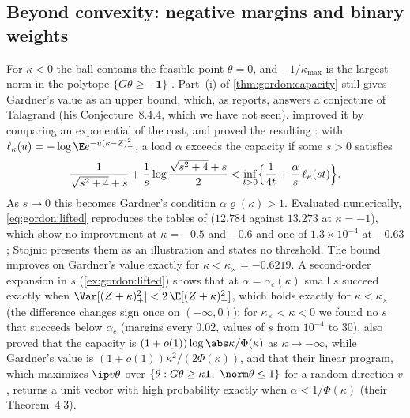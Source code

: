 \begin{refsection}
\subsection{Beyond convexity: negative margins and binary weights}\label{sec:gordon:beyond}

For $\kappa<0$ the ball contains the feasible point $\theta=0$, and $-1/\kappa_{\max}$ is the largest norm in the polytope $\{G\theta\ge-\mathbf 1\}$ \parencite{MontanariZhongZhou2024}. Part~(i) of \cref{thm:gordon:capacity} still gives Gardner's value as an upper bound, which, as \textcite[Section~2.3]{Stojnic2013a} reports, answers a conjecture of Talagrand (his Conjecture~8.4.4, which we have not seen). \Textcite{Stojnic2013b} improved it by comparing an exponential of the cost, and \textcite[Definition~2, Theorem~4.2]{MontanariZhongZhou2024} proved the resulting : with $\ell_\kappa(u)=-\log\E e^{-u(\kappa-Z)_+^2}$, a load $\alpha$ exceeds the capacity if some $s>0$ satisfies
\begin{equation}\label{eq:gordon:lifted}
\frac1{\sqrt{s^2+4}+s}+\frac1s\log\frac{\sqrt{s^2+4}+s}2<\inf_{t>0}\Bigl\{\frac1{4t}+\frac\alpha s\,\ell_\kappa(st)\Bigr\}.
\end{equation}
As $s\to0$ this becomes Gardner's condition $\alpha\varrho(\kappa)>1$. Evaluated numerically, \eqref{eq:gordon:lifted} reproduces the tables of \textcite{Stojnic2013b} ($12.784$ against $13.273$ at $\kappa=-1$), which show no improvement at $\kappa=-0.5$ and $-0.6$ and one of $1.3\times10^{-4}$ at $-0.63$; Stojnic presents them as an illustration and states no threshold. The bound improves on Gardner's value exactly for $\kappa<\kappa_\times=-0.6219$. A second-order expansion in $s$ (\cref{ex:gordon:lifted}) shows that at $\alpha=\alpha_c(\kappa)$ small $s$ succeed exactly when $\Var[(Z+\kappa)_+^2]<2\,\E[(Z+\kappa)_+^2]$, which holds exactly for $\kappa<\kappa_\times$ (the difference changes sign once on $(-\infty,0)$); for $\kappa_\times<\kappa<0$ we found no $s$ that succeeds below $\alpha_c$ (margins every $0.02$, values of $s$ from $10^{-4}$ to $30$). \Textcite{MontanariZhongZhou2024} also proved that the capacity is $(1+o(1))\log\abs\kappa/\Phi(\kappa)$ as $\kappa\to-\infty$, while Gardner's value is $(1+o(1))\kappa^2/(2\Phi(\kappa))$, and that their linear program, which maximizes $\ip v\theta$ over $\{\theta:G\theta\ge\kappa\mathbf 1,\ \norm\theta\le1\}$ for a random direction $v$, returns a unit vector with high probability exactly when $\alpha<1/\Phi(\kappa)$ (their Theorem~4.3).


\end{refsection}

